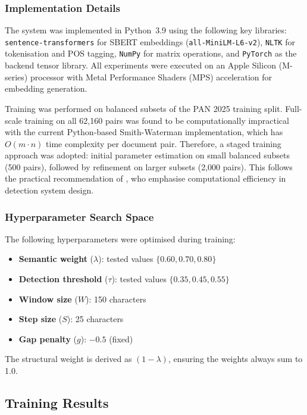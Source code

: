 \documentclass[12pt, a4paper]{article}
\begin{document}
\subsubsection{Implementation Details}

The system was implemented in Python~3.9 using the following key libraries: \texttt{sentence\allowbreak-\allowbreak transformers} for SBERT embeddings (\texttt{all\allowbreak-\allowbreak MiniLM\allowbreak-\allowbreak L6\allowbreak-\allowbreak v2}), \texttt{NLTK} for tokenisation and POS tagging, \texttt{NumPy} for matrix operations, and \texttt{PyTorch} as the backend tensor library. All experiments were executed on an Apple Silicon (M-series) processor with Metal Performance Shaders (MPS) acceleration for embedding generation.

Training was performed on balanced subsets of the PAN 2025 training split. Full-scale training on all 62,160 pairs was found to be computationally impractical with the current Python-based Smith-Waterman implementation, which has $O(m \cdot n)$ time complexity per document pair. Therefore, a staged training approach was adopted: initial parameter estimation on small balanced subsets (500 pairs), followed by refinement on larger subsets (2,000 pairs). This follows the practical recommendation of \citet{JingLiu2023}, who emphasise computational efficiency in detection system design.

\subsubsection{Hyperparameter Search Space}

The following hyperparameters were optimised during training:

\begin{itemize}
	\item \textbf{Semantic weight} ($\lambda$): tested values $\{0.60, 0.70, 0.80\}$
	\item \textbf{Detection threshold} ($\tau$): tested values $\{0.35, 0.45, 0.55\}$
	\item \textbf{Window size} ($W$): 150 characters
	\item \textbf{Step size} ($S$): 25 characters
	\item \textbf{Gap penalty} ($g$): $-0.5$ (fixed)
\end{itemize}

The structural weight is derived as $(1 - \lambda)$, ensuring the weights always sum to 1.0.

\subsection{Training Results}
\end{document}
